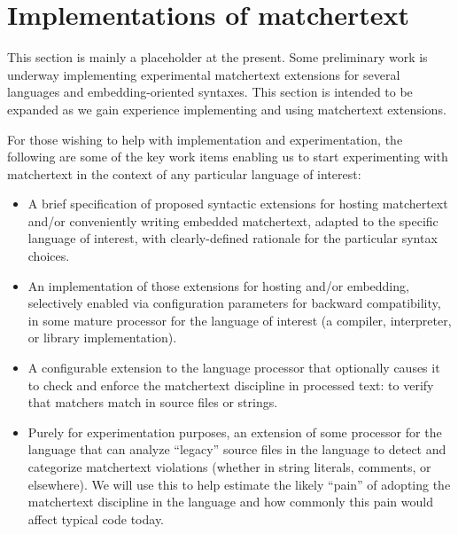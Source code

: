 \section{Implementations of matchertext}
\label{sec:impl}

This section is mainly a placeholder at the present.
Some preliminary work is underway
implementing experimental matchertext extensions
for several languages and embedding-oriented syntaxes.
This section is intended to be expanded
as we gain experience
implementing and using matchertext extensions.

For those wishing to help with implementation and experimentation,
the following are some of the key work items
enabling us to start experimenting with matchertext in the context
of any particular language of interest:
\begin{itemize}
\item	A brief specification of proposed
	syntactic extensions for hosting matchertext
	and/or conveniently writing embedded matchertext,
	adapted to the specific language of interest,
	with clearly-defined rationale for the particular syntax choices.
\item	An implementation of those extensions for hosting and/or embedding,
	selectively enabled via configuration parameters
	for backward compatibility,
	in some mature processor for the language of interest
	(\eg a compiler, interpreter, or library implementation).
\item	A configurable extension to the language processor
	that optionally causes it
	to check and enforce the matchertext discipline
	in processed text:
	\ie to verify that matchers match in source files or strings.
\item	Purely for experimentation purposes,
	an extension of some processor for the language
	that can analyze ``legacy'' source files in the language
	to detect and categorize matchertext violations
	(\eg whether in string literals, comments, or elsewhere).
	We will use this to help estimate the likely ``pain''
	of adopting the matchertext discipline in the language
	and how commonly this pain would affect typical code today.
\end{itemize}
